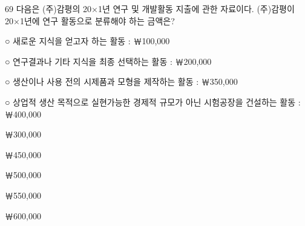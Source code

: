 \begin{question}{69}
다음은 (주)감평의 20×1년 연구 및 개발활동 지출에 관한 자료이다. (주)감평이 20×1년에 연구 활동으로 분류해야 하는 금액은?
\begin{framedtext}
○ 새로운 지식을 얻고자 하는 활동 : ￦100,000 \par
○ 연구결과나 기타 지식을 최종 선택하는 활동 : ￦200,000 \par
○ 생산이나 사용 전의 시제품과 모형을 제작하는 활동 : ￦350,000 \par
○ 상업적 생산 목적으로 실현가능한 경제적 규모가 아닌 시험공장을 건설하는 활동 : ￦400,000
\end{framedtext}
\begin{choices}
  \item ￦300,000
  \item ￦450,000
  \item ￦500,000
  \item ￦550,000
  \item ￦600,000
\end{choices}
\end{question}

